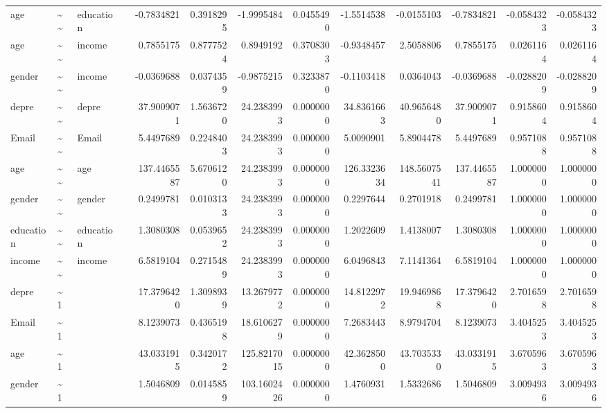 \documentclass[
]{article}
\begin{document}
\begin{table}[!h]
\begin{tabular}[t]{llllrrrrrrrrr}
age & \textasciitilde{}\textasciitilde{} & education &  & -0.7834821 & 0.3918295 & -1.9995484 & 0.0455490 & -1.5514538 & -0.0155103 & -0.7834821 & -0.0584323 & -0.0584323\\
age & \textasciitilde{}\textasciitilde{} & income &  & 0.7855175 & 0.8777524 & 0.8949192 & 0.3708303 & -0.9348457 & 2.5058806 & 0.7855175 & 0.0261164 & 0.0261164\\
gender & \textasciitilde{}\textasciitilde{} & income &  & -0.0369688 & 0.0374359 & -0.9875215 & 0.3233870 & -0.1103418 & 0.0364043 & -0.0369688 & -0.0288209 & -0.0288209\\
\addlinespace
depre & \textasciitilde{}\textasciitilde{} & depre &  & 37.9009071 & 1.5636720 & 24.2383993 & 0.0000000 & 34.8361663 & 40.9656480 & 37.9009071 & 0.9158604 & 0.9158604\\
Email & \textasciitilde{}\textasciitilde{} & Email &  & 5.4497689 & 0.2248403 & 24.2383993 & 0.0000000 & 5.0090901 & 5.8904478 & 5.4497689 & 0.9571088 & 0.9571088\\
age & \textasciitilde{}\textasciitilde{} & age &  & 137.4465587 & 5.6706120 & 24.2383993 & 0.0000000 & 126.3323634 & 148.5607541 & 137.4465587 & 1.0000000 & 1.0000000\\
gender & \textasciitilde{}\textasciitilde{} & gender &  & 0.2499781 & 0.0103133 & 24.2383993 & 0.0000000 & 0.2297644 & 0.2701918 & 0.2499781 & 1.0000000 & 1.0000000\\
education & \textasciitilde{}\textasciitilde{} & education &  & 1.3080308 & 0.0539652 & 24.2383993 & 0.0000000 & 1.2022609 & 1.4138007 & 1.3080308 & 1.0000000 & 1.0000000\\
\addlinespace
income & \textasciitilde{}\textasciitilde{} & income &  & 6.5819104 & 0.2715489 & 24.2383993 & 0.0000000 & 6.0496843 & 7.1141364 & 6.5819104 & 1.0000000 & 1.0000000\\
depre & \textasciitilde{}1 &  &  & 17.3796420 & 1.3098939 & 13.2679772 & 0.0000000 & 14.8122972 & 19.9469868 & 17.3796420 & 2.7016598 & 2.7016598\\
Email & \textasciitilde{}1 &  &  & 8.1239073 & 0.4365198 & 18.6106279 & 0.0000000 & 7.2683443 & 8.9794704 & 8.1239073 & 3.4045253 & 3.4045253\\
age & \textasciitilde{}1 &  &  & 43.0331915 & 0.3420172 & 125.8217015 & 0.0000000 & 42.3628500 & 43.7035330 & 43.0331915 & 3.6705963 & 3.6705963\\
gender & \textasciitilde{}1 &  &  & 1.5046809 & 0.0145859 & 103.1602426 & 0.0000000 & 1.4760931 & 1.5332686 & 1.5046809 & 3.0094936 & 3.0094936\\

\end{tabular}
\end{table}
\end{document}
